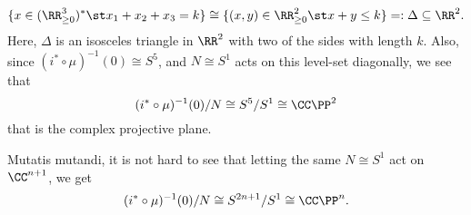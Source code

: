 \begin{equation*}
	\{ x \in (\RR_{\geq 0}^{3})^{\ast} \st x_{1} + x_{2} + x_{3} = k \} \cong \{ (x,y) \in \RR_{\geq 0}^{2} \st x + y \leq k \} =: \Delta \subseteq \RR^{2}.
\end{equation*}
Here, $\Delta$ is an isosceles triangle in $\RR^{2}$ with two of the sides with length $k$. Also, since $(i^{\ast} \circ \mu)^{-1}(0) \cong S^{5}$, and $N\cong S^{1}$ acts on this level-set diagonally, we see that
\begin{equation*}
	(i^{\ast} \circ \mu)^{-1}(0)/N \cong S^{5}/S^{1} \cong \CC\PP^{2}
\end{equation*}
that is the complex projective plane.

Mutatis mutandi, it is not hard to see that letting the same $N \cong S^{1}$ act on $\CC^{n+1}$, we get 
\begin{equation*}
	(i^{\ast} \circ \mu)^{-1}(0)/N \cong S^{2n+1}/S^{1} \cong \CC\PP^{n}.
\end{equation*}

